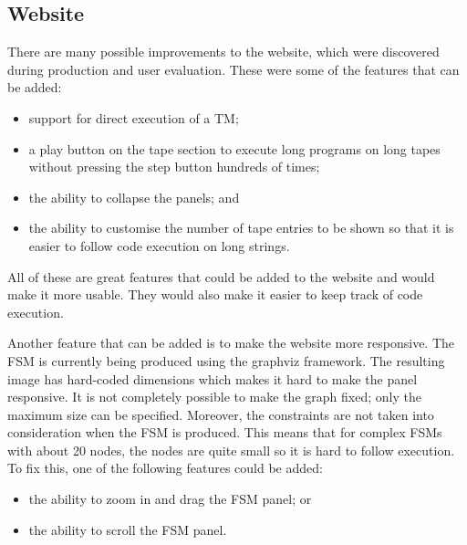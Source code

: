  \subsection{Website}
There are many possible improvements to the website, which were discovered during production and user evaluation. These were some of the features that can be added:
\begin{itemize}
    \item support for direct execution of a TM;
    \item a play button on the tape section to execute long programs on long tapes without pressing the step button hundreds of times;
    \item the ability to collapse the panels; and
    \item the ability to customise the number of tape entries to be shown so that it is easier to follow code execution on long strings.
\end{itemize}
All of these are great features that could be added to the website and would make it more usable. They would also make it easier to keep track of code execution. 

Another feature that can be added is to make the website more responsive. The FSM is currently being produced using the graphviz framework. The resulting image has hard-coded dimensions which makes it hard to make the panel responsive. It is not completely possible to make the graph fixed; only the maximum size can be specified. Moreover, the constraints are not taken into consideration when the FSM is produced. This means that for complex FSMs with about 20 nodes, the nodes are quite small so it is hard to follow execution. To fix this, one of the following features could be added:
\begin{itemize}
    \item the ability to zoom in and drag the FSM panel; or
    \item the ability to scroll the FSM panel.
\end{itemize}

